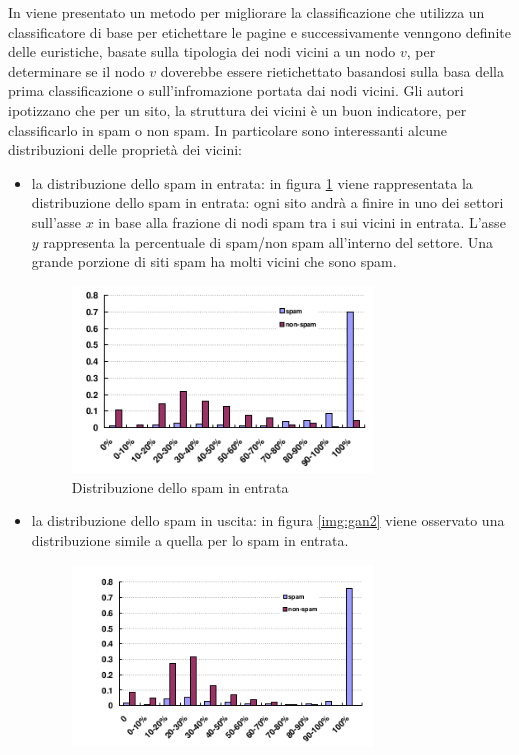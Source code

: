 In \cite{Gan:2007:IWS:1244408.1244412} viene presentato un metodo per migliorare la classificazione che utilizza un classificatore di base per etichettare le pagine e successivamente venngono definite delle euristiche, basate sulla tipologia dei nodi vicini a un nodo \(v\), per determinare se il nodo \(v\) doverebbe essere rietichettato basandosi sulla basa della prima classificazione o sull'infromazione portata dai nodi vicini. Gli autori ipotizzano che per un sito, la struttura dei vicini è un buon indicatore,  per classificarlo in  spam o non spam. In particolare sono interessanti alcune distribuzioni delle proprietà dei vicini:
\begin{itemize}
 \item la distribuzione dello spam in entrata:  in figura \ref{img:gan1} viene rappresentata la distribuzione dello spam in entrata: ogni sito andrà a finire in uno dei settori sull'asse \(x\) in base alla frazione di nodi spam tra i sui vicini in entrata. L'asse \(y\) rappresenta la percentuale di spam/non spam all'interno del settore. Una grande porzione di siti spam ha molti vicini che sono spam. 
 \begin{figure}
 \centering
\includegraphics[width=8cm]{immagini/gan/immagine1.png}
\caption{Distribuzione dello spam in entrata}
\label{img:gan1}
\end{figure}
\item la distribuzione dello spam in uscita: in figura \ref{img:gan2} viene osservato una distribuzione simile a quella per lo spam in entrata.
 \begin{figure}
 \centering
\includegraphics[width=8cm]{immagini/gan/immagine2.png}

\end{figure}
\end{itemize}

